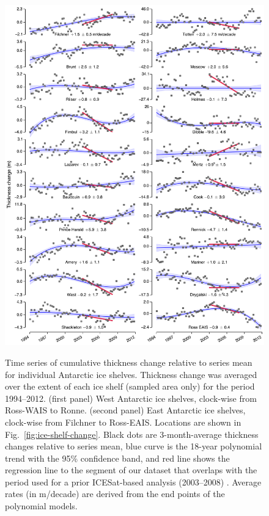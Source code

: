 \begin{figure}[!h]
  \centering
  \includegraphics[width=\textwidth]{img/Sup1_ts_shelves_eais_review_v7.png}
\end{figure}

\begin{figure}
  \captionsetup{labelformat=adja-page}
  \caption[Time series of cumulative thickness change (ice shelves)]{
Time series of cumulative thickness change relative to series mean for individual Antarctic ice shelves. Thickness change was averaged over the extent of each ice shelf (sampled area only) for the period 1994--2012. (first panel) West Antarctic ice shelves, clock-wise from Ross-WAIS to Ronne. (second panel) East Antarctic ice shelves, clock-wise from Filchner to Ross-EAIS. Locations are shown in Fig.~\ref{fig:ice-shelf-change}. Black dots are 3-month-average thickness changes relative to series mean, blue curve is the 18-year polynomial trend with the 95\% confidence band, and red line shows the regression line to the segment of our dataset that overlaps with the period used for a prior ICESat-based analysis (2003--2008) \parencite{Pritchard2012}. Average rates (in m/decade) are derived from the end points of the polynomial models.
  }
  \label{fig:ts-ice-shelves}
\end{figure}


